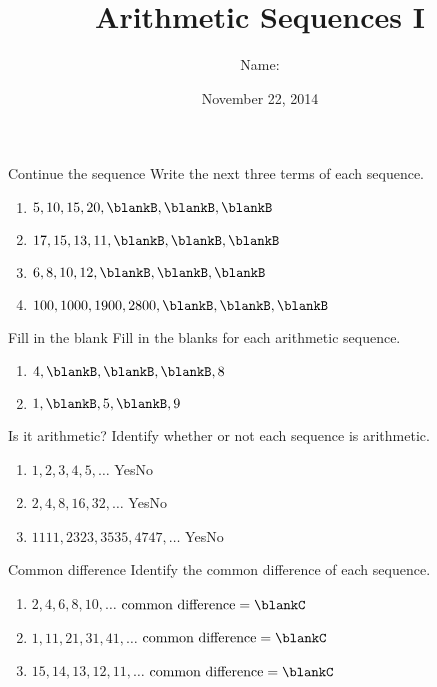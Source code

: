 \documentclass[12pt,letterpaper]{article}
\title{Arithmetic Sequences I}
\author{Name: \underline{\hspace{5cm}}}
\date{November 22, 2014}
\begin{document}
\maketitle

\thispagestyle{empty}

\begin{problem}{Continue the sequence}
 Write the next three terms of each sequence.

 \begin{enumerate}[\hspace{.5cm}a.]
  \item $5, 10, 15, 20, \blankB, \blankB, \blankB$
  \item $17, 15, 13, 11, \blankB, \blankB, \blankB$
  \item $6, 8, 10, 12, \blankB, \blankB, \blankB$
  \item $100, 1000, 1900, 2800, \blankB, \blankB, \blankB$
 \end{enumerate}
\end{problem}

\begin{problem}{Fill in the blank}
 Fill in the blanks for each arithmetic sequence.

 \begin{enumerate}[\hspace{.5cm}a.]
  \item $4, \blankB, \blankB, \blankB, 8$
  \item $1, \blankB, 5, \blankB, 9$
 \end{enumerate}
\end{problem}

\begin{problem}{Is it arithmetic?}
 Identify whether or not each sequence is arithmetic.

 \begin{enumerate}[\hspace{.5cm}a.]
  \item $1, 2, 3, 4, 5, \ldots$ \hfill Yes\hspace{3em}No
  \item $2, 4, 8, 16, 32, \ldots$ \hfill Yes\hspace{3em}No
  \item $1111, 2323, 3535, 4747, \ldots$ \hfill Yes\hspace{3em}No
 \end{enumerate}
\end{problem}

\begin{problem}{Common difference}
 Identify the common difference of each sequence.

 \begin{enumerate}[\hspace{.5cm}a.]
  \item $2, 4, 6, 8, 10, \ldots$ \hfill $\text{common difference} = \blankC$
  \item $1, 11, 21, 31, 41, \ldots$ \hfill $\text{common difference} = \blankC$
  \item $15, 14, 13, 12,
  11, \ldots$ \hfill $\text{common difference} = \blankC$
 \end{enumerate}
\end{problem}
\end{document}
